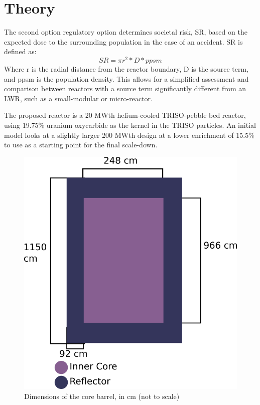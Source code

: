 \documentclass{anstrans}
\begin{document}
\section{Theory}
The second option regulatory option determines societal risk, SR, based on the expected dose to the surrounding population in the case of an accident.  SR is defined as:
\begin{subequations} \label{eqs:NRCSR}
\begin{equation} \label{eq:SRspecific}
SR = \pi r^{2} * D * ppsm
\end{equation}
\end{subequations}
Where r is the radial distance from the reactor boundary, D is the source term, and ppsm is the population density.  This allows for a simplified assessment and comparison between reactors with a source term significantly different from an LWR, such as a small-modular or micro-reactor.

The proposed reactor is a 20 MWth helium-cooled TRISO-pebble bed reactor, using 19.75\% uranium oxycarbide as the kernel in the TRISO particles.  An initial model looks at a slightly larger 200 MWth design at a lower enrichment of 15.5\% to use as a starting point for the final scale-down.
\begin{figure}[H]
  \centering
  \includegraphics[width = \linewidth]{reactor-geom}
  \caption{Dimensions of the core barrel, in cm (not to scale)}
  \label{fig:reactor-dimension}
\end{figure}
\end{document}
